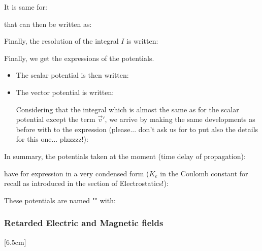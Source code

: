 	It is same for:
	
	that can then be written as:
	
	Finally, the resolution of the integral $I$ is written:
	
	Finally, we get the expressions of the potentials.
	\begin{itemize}
		\item The scalar potential is then written:
		

		\item The vector potential is written:
		
		Considering that the integral which is almost the same as for the scalar potential except the term $\vec{v}'$, we arrive by making the same developments as before with to the expression (please... don't ask us for to put also the details for this one... plzzzzz!):
	
	\end{itemize}
	In summary, the potentials taken at the moment (time delay of propagation):
	
	have for expression in a very condensed form ($K_e$ in the Coulomb constant for recall as introduced in the section of Electrostatics!):
	
	These potentials are named "" with:
	
	
	\subsubsection{Retarded Electric and Magnetic fields}
	[6.5cm]
	
	
	
	
	
	
	
	
	
	
	
	
	
	
	
	
	
	
	
	
	
	
	
	
	
	
	
	
	
	
	
	
	
	
	
	
	
	
	
	
	
